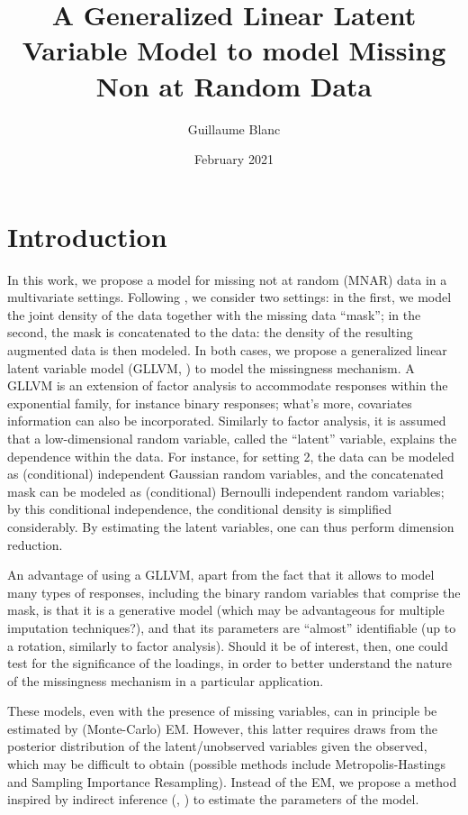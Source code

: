 \documentclass{article}
\title{A Generalized Linear Latent Variable Model to model Missing Non at Random Data}
\author{Guillaume Blanc}
\date{February 2021}
\begin{document}
\maketitle
\section{Introduction}
In this work, we propose a model for missing not at random (MNAR) data in a multivariate settings. Following \textcite{sportisse_imputation_2020}, we consider two settings: in the first, we model the joint density of the data together with the missing data ``mask''; in the second, the mask is concatenated to the data: the density of the resulting augmented data is then modeled. In both cases, we propose a generalized linear latent variable model (GLLVM, \cite{skrondal_generalized_2004}) to model the missingness mechanism. A GLLVM is an extension of factor analysis to accommodate responses within the exponential family, for instance binary responses; what's more, covariates information can also be incorporated. Similarly to factor analysis, it is assumed that a low-dimensional random variable, called the ``latent'' variable, explains the dependence within the data. For instance, for setting 2, the data can be modeled as (conditional) independent Gaussian random variables, and the concatenated mask can be modeled as (conditional) Bernoulli independent random variables; by this conditional independence, the conditional density is simplified considerably. By estimating the latent variables, one can thus perform dimension reduction. 

An advantage of using a GLLVM, apart from the fact that it allows to model many types of responses, including the binary random variables that comprise the mask, is that it is a generative model (which may be advantageous for multiple imputation techniques?), and that its parameters are ``almost'' identifiable (up to a rotation, similarly to factor analysis). Should it be of interest, then, one could test for the significance of the loadings, in order to better understand the nature of the missingness mechanism in a particular application.

These models, even with the presence of missing variables, can in principle be estimated by (Monte-Carlo) EM. However, this latter requires draws from the posterior distribution of the latent/unobserved variables given the observed, which may be difficult to obtain (possible methods include Metropolis-Hastings and Sampling Importance Resampling). Instead of the EM, we propose a method inspired by indirect inference (\cite{gourieroux_indirect_1993}, \cite{gallant_which_1996}) to estimate the parameters of the model.
\end{document}
